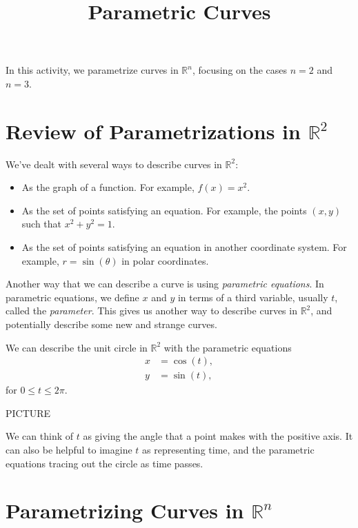 \documentclass{ximera}
\title{Parametric Curves}
\begin{document}
\begin{abstract}
\end{abstract}
\maketitle

In this activity, we parametrize curves in $\mathbb{R}^n$, focusing on the cases $n=2$ and $n=3$.

\section{Review of Parametrizations in $\mathbb{R}^2$}

We've dealt with several ways to describe curves in $\mathbb{R}^2$:
\begin{itemize}
\item As the graph of a function. For example, $f(x) = x^2$.
\item As the set of points satisfying an equation. For example, the points $(x,y)$ such that $x^2 + y^2 = 1$.
\item As the set of points satisfying an equation in another coordinate system. For example, $r = \sin(\theta)$ in polar coordinates.
\end{itemize}

Another way that we can describe a curve is using \emph{parametric equations}. In parametric equations, we define $x$ and $y$ in terms of a third variable, usually $t$, called the \emph{parameter}. This gives us another way to describe curves in $\mathbb{R}^2$, and potentially describe some new and strange curves.

\begin{example}
We can describe the unit circle in $\mathbb{R}^2$ with the parametric equations
\begin{align*}
x & = \cos(t),\\
y & = \sin(t),
\end{align*}
for $0\leq t \leq 2\pi$.

PICTURE

We can think of $t$ as giving the angle that a point makes with the positive axis. It can also be helpful to imagine $t$ as representing time, and the parametric equations tracing out the circle as time passes.
\end{example}

\section{Parametrizing Curves in $\mathbb{R}^n$}
\end{document}
